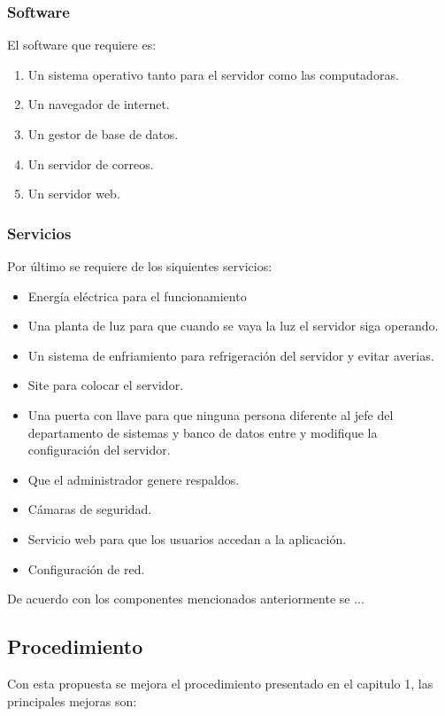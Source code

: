 \subsubsection{Software}
El software que requiere es: 
\begin{enumerate}
	\item Un sistema operativo tanto para el servidor como las computadoras.
	\item Un navegador de internet.
	\item Un gestor de base de datos.
	\item Un servidor de correos.
	\item Un servidor web.
\end{enumerate}
\subsubsection{Servicios}

Por último se requiere de los siquientes servicios: 
\begin{itemize}
	\item Energía eléctrica para el funcionamiento
	\item Una planta de luz para que cuando se vaya la luz el servidor siga operando.
	\item Un sistema de enfriamiento para refrigeración del servidor y evitar averias.
	\item Site para colocar el servidor.
	\item Una puerta con llave para que ninguna persona diferente al jefe del departamento de sistemas y banco de datos entre y modifique la configuración del servidor.
	\item Que el administrador genere respaldos.
	\item Cámaras de seguridad. 
	\item Servicio web para que los usuarios accedan a la aplicación. 
	\item Configuración de red.
\end{itemize} 

De acuerdo con los componentes mencionados anteriormente se ...
\subsection{Procedimiento}
Con esta propuesta se mejora el procedimiento presentado en el capitulo 1, las principales mejoras son:

